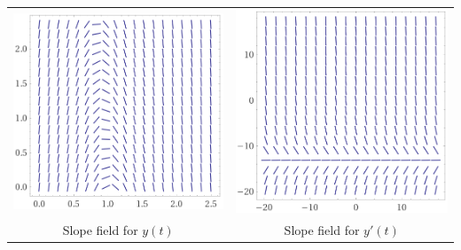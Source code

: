 \setlength{\len}{200pt}
\begin{tabular}{cc}
\includegraphics*[height=\len]{images/module9-y.png}
	& \includegraphics*[height=\len]{images/module9-yprime.png} \\
Slope field for $y(t)$
	& Slope field for $y'(t)$
\end{tabular}

